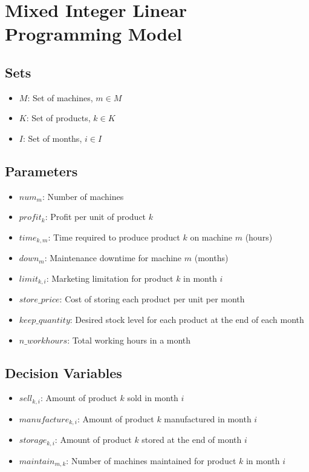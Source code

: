 \documentclass{article}
\begin{document}
\section*{Mixed Integer Linear Programming Model}

\subsection*{Sets}
\begin{itemize}
    \item $M$: Set of machines, $m \in M$
    \item $K$: Set of products, $k \in K$
    \item $I$: Set of months, $i \in I$
\end{itemize}

\subsection*{Parameters}
\begin{itemize}
    \item $num_m$: Number of machines
    \item $profit_k$: Profit per unit of product $k$
    \item $time_{k,m}$: Time required to produce product $k$ on machine $m$ (hours)
    \item $down_m$: Maintenance downtime for machine $m$ (months)
    \item $limit_{k,i}$: Marketing limitation for product $k$ in month $i$
    \item $store\_price$: Cost of storing each product per unit per month
    \item $keep\_quantity$: Desired stock level for each product at the end of each month
    \item $n\_workhours$: Total working hours in a month
\end{itemize}

\subsection*{Decision Variables}
\begin{itemize}
    \item $sell_{k,i}$: Amount of product $k$ sold in month $i$
    \item $manufacture_{k,i}$: Amount of product $k$ manufactured in month $i$
    \item $storage_{k,i}$: Amount of product $k$ stored at the end of month $i$
    \item $maintain_{m,k}$: Number of machines maintained for product $k$ in month $i$
\end{itemize}
\end{document}
